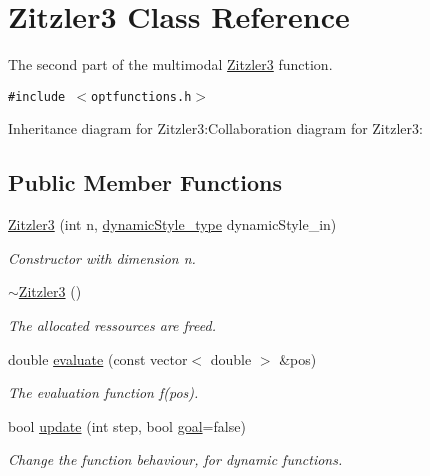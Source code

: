 \hypertarget{classZitzler3}{
\section{Zitzler3 Class Reference}
\label{classZitzler3}
}
The second part of the multimodal \hyperlink{classZitzler3}{Zitzler3} function.  


{\tt \#include $<$optfunctions.h$>$}

Inheritance diagram for Zitzler3:Collaboration diagram for Zitzler3:\subsection*{Public Member Functions}
\begin{CompactItemize}
\item 
\hyperlink{classZitzler3_a162103160dfcf331b0cc697549c6659}{Zitzler3} (int n, \hyperlink{optfunctions_8h_ae9aa3a5dd199a43e77abc2cccf4477e}{dynamicStyle\_\-type} dynamicStyle\_\-in)
\begin{CompactList}\small\item\em Constructor with dimension n. \item\end{CompactList}\item 
\hyperlink{classZitzler3_6bec05586d5f1cf661f57afe09debeee}{$\sim$Zitzler3} ()
\begin{CompactList}\small\item\em The allocated ressources are freed. \item\end{CompactList}\item 
double \hyperlink{classZitzler3_1a6ae3e995a89c472fcea592e0fb7d67}{evaluate} (const vector$<$ double $>$ \&pos)
\begin{CompactList}\small\item\em The evaluation function f(pos). \item\end{CompactList}\item 
bool \hyperlink{classZitzler3_6beb6eca13774e5dd172f2a7d3f1f76f}{update} (int step, bool \hyperlink{classFunction_d9eec4e429707542493d16d83fcb7f54}{goal}=false)
\begin{CompactList}\small\item\em Change the function behaviour, for dynamic functions. \item\end{CompactList}\end{CompactItemize}


